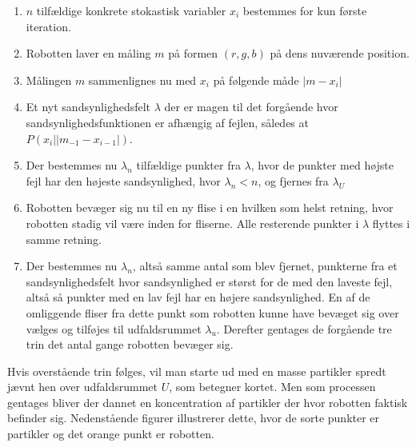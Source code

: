 \documentclass[../../SRP.tex]{subfiles}
\begin{document}
\begin{enumerate}
  \item $n$ tilfældige konkrete stokastisk variabler $x_i$ bestemmes for kun første iteration.

  \item Robotten laver en måling $m$ på formen $(r,g,b)$ på dens nuværende position.

  \item Målingen $m$ sammenlignes nu med $x_i$ på følgende måde $|m - x_i|$

  \item Et nyt sandsynlighedsfelt $\lambda$ der er magen til det forgående hvor sandsynlighedsfunktionen er afhængig af fejlen, således at $P(x_i | |m_{-1} - x_{i-1}|)$.

  \item Der bestemmes nu $\lambda_n$ tilfældige punkter fra $\lambda$, hvor de punkter med højste fejl har den højeste sandsynlighed, hvor $ \lambda_n < n$, og fjernes fra $\lambda_U$

  \item Robotten bevæger sig nu til en ny flise i en hvilken som helst retning, hvor robotten stadig vil være inden for fliserne. Alle resterende punkter i $\lambda$ flyttes i samme retning.

  \item Der bestemmes nu $\lambda_n$, altså samme antal som blev fjernet, punkterne fra et sandsynlighedsfelt hvor sandsynlighed er størst for de med den laveste fejl, altså så punkter med en lav fejl har en højere sandsynlighed. En af de omliggende fliser fra dette punkt som robotten kunne have bevæget sig over vælges og tilføjes til udfaldsrummet $\lambda_u$. Derefter gentages de forgående tre trin det antal gange robotten bevæger sig.
\end{enumerate}
Hvis overstående trin følges, vil man starte ud med en masse partikler spredt jævnt hen over udfaldsrummet $U$, som betegner kortet. Men som processen gentages bliver der dannet en koncentration af partikler der hvor robotten faktisk befinder sig. Nedenstående figurer illustrerer dette, hvor de sorte punkter er partikler og det orange punkt er robotten.
\end{document}
